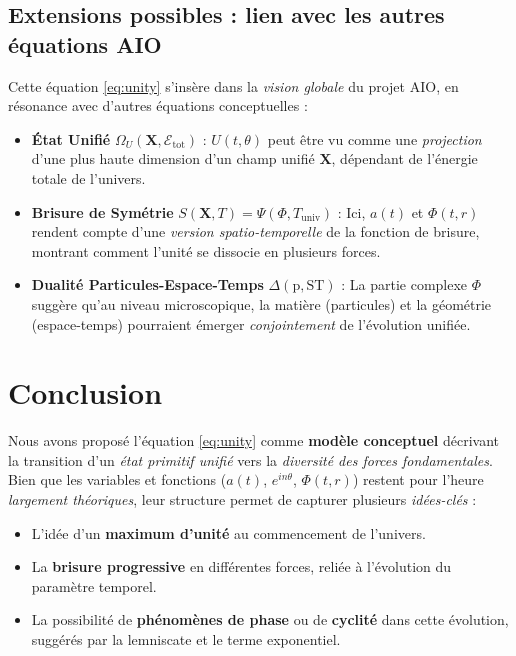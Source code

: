 \documentclass[12pt]{article}
\begin{document}
\subsection{Extensions possibles : lien avec les autres équations AIO}

Cette équation \eqref{eq:unity} s’insère dans la \emph{vision globale} 
du projet AIO, en résonance avec d’autres équations conceptuelles :
\begin{itemize}
    \item \textbf{État Unifié} $\Omega_U(\mathbf{X}, \mathcal{E}_{\mathrm{tot}})$ 
          \cite{weinberg1995quantum}: $U(t,\theta)$ peut être vu comme une \emph{projection} 
          d’une plus haute dimension d’un champ unifié $\mathbf{X}$, 
          dépendant de l’énergie totale de l’univers.
    \item \textbf{Brisure de Symétrie} $S(\mathbf{X}, T) = \Psi(\Phi, T_{\mathrm{univ}})$ : 
          Ici, $a(t)$ et $\Phi(t,r)$ rendent compte d’une \emph{version spatio-temporelle} 
          de la fonction de brisure, montrant comment l’unité se dissocie en plusieurs forces.
    \item \textbf{Dualité Particules-Espace-Temps} $\Delta(\mathrm{p}, \mathrm{ST})$ : 
          La partie complexe $\Phi$ suggère qu’au niveau microscopique, la matière (particules) 
          et la géométrie (espace-temps) pourraient émerger \emph{conjointement} 
          de l’évolution unifiée.
\end{itemize}

\section{Conclusion}

Nous avons proposé l'équation \eqref{eq:unity} comme \textbf{modèle conceptuel} 
décrivant la transition d'un \emph{état primitif unifié} vers la \emph{diversité 
des forces fondamentales}. Bien que les variables et fonctions ($a(t)$, $e^{i n \theta}$, 
$\Phi(t,r)$) restent pour l'heure \emph{largement théoriques}, leur structure 
permet de capturer plusieurs \emph{idées-clés} :
\begin{itemize}
    \item L’idée d’un \textbf{maximum d’unité} au commencement de l’univers.
    \item La \textbf{brisure progressive} en différentes forces, reliée 
          à l’évolution du paramètre temporel.
    \item La possibilité de \textbf{phénomènes de phase} ou de \textbf{cyclité} 
          dans cette évolution, suggérés par la lemniscate et le terme exponentiel.
\end{itemize}
\end{document}
